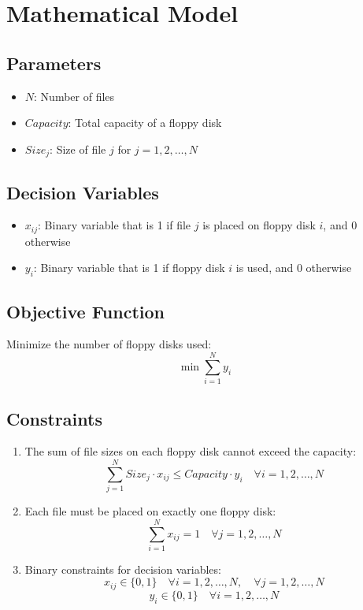 \documentclass{article}
\begin{document}
\section*{Mathematical Model}

\subsection*{Parameters}
\begin{itemize}
    \item $N$: Number of files
    \item $Capacity$: Total capacity of a floppy disk
    \item $Size_j$: Size of file $j$ for $j = 1, 2, \ldots, N$
\end{itemize}

\subsection*{Decision Variables}
\begin{itemize}
    \item $x_{ij}$: Binary variable that is 1 if file $j$ is placed on floppy disk $i$, and 0 otherwise
    \item $y_i$: Binary variable that is 1 if floppy disk $i$ is used, and 0 otherwise
\end{itemize}

\subsection*{Objective Function}
Minimize the number of floppy disks used:
\[
\min \sum_{i=1}^{N} y_i
\]

\subsection*{Constraints}
\begin{enumerate}
    \item The sum of file sizes on each floppy disk cannot exceed the capacity:
    \[
    \sum_{j=1}^{N} Size_j \cdot x_{ij} \leq Capacity \cdot y_i \quad \forall i = 1, 2, \ldots, N
    \]
    \item Each file must be placed on exactly one floppy disk:
    \[
    \sum_{i=1}^{N} x_{ij} = 1 \quad \forall j = 1, 2, \ldots, N
    \]
    \item Binary constraints for decision variables:
    \[
    x_{ij} \in \{0, 1\} \quad \forall i = 1, 2, \ldots, N, \quad \forall j = 1, 2, \ldots, N
    \]
    \[
    y_i \in \{0, 1\} \quad \forall i = 1, 2, \ldots, N
    \]
\end{enumerate}
\end{document}
